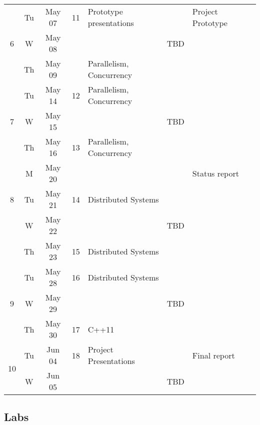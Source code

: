 \documentclass[11pt]{article}
\newcommand{\emptycell}{\cellcolor[gray]{0.9}}
\begin{document}
\begin{landscape}
\begin{longtable}{|c|cc|c|p{7cm}|p{6cm}|p{2cm}|c|}
\multirow{3}{*}{6} 	& Tu & May 07 	& 11 		& Prototype presentations	& \emptycell  	& Project \mbox{Prototype}\\ \cline{ 2- 8}
			& W & May 08	& \emptycell 	& \emptycell			& TBD	 	& \emptycell \\ \cline{ 2- 8}
			& Th & May 09 	& \emptycell	& Parallelism, Concurrency  	& \emptycell    & \emptycell \\ \hline\hline

\multirow{3}{*}{7} 	& Tu & May 14 	& 12 		& Parallelism, Concurrency		& \emptycell  	& \emptycell \\ \cline{ 2- 8}
			& W & May 15	& \emptycell 	& \emptycell			& TBD	 	& \emptycell \\ \cline{ 2- 8}
			& Th & May 16 	& 13 		& Parallelism, Concurrency 	& \emptycell  	& \emptycell \\ \hline\hline

\multirow{3}{*}{8}	& M & May 20 	& \emptycell	& \emptycell    		& \emptycell  	& Status report \\ \cline{ 2- 8}
			& Tu & May 21 	& 14 		& Distributed Systems	& \emptycell  	& \emptycell \\ \cline{ 2- 8}
			& W & May 22	& \emptycell 	& \emptycell			& TBD	 	& \emptycell \\ \cline{ 2- 8}
			& Th & May 23 	& 15 		& Distributed Systems 	& \emptycell  	& \emptycell \\ \hline\hline

\multirow{3}{*}{9} 	& Tu & May 28 	& 16 		& Distributed Systems		& \emptycell &  \emptycell  	 \\ \cline{ 2- 8}
			& W & May 29	& \emptycell 	& \emptycell			& TBD	 	& \emptycell \\ \cline{ 2- 8}
			& Th & May 30 	& 17 		& C++11	 	& \emptycell  	& \emptycell \\ \hline\hline

\multirow{3}{*}{10} 	& Tu & Jun 04 	& 18 		& Project Presentations		& \emptycell  	& Final report \\ \cline{ 2- 8}
			& W & Jun 05	& \emptycell 	& \emptycell			& TBD	 	& \emptycell \\ \cline{ 2- 8}

\end{longtable}

\end{landscape}



\subsection{Labs}
\end{document}
